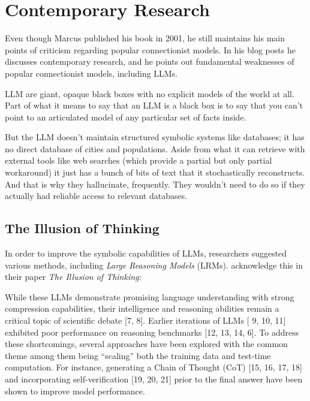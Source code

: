 \documentclass[../../main.tex]{subfiles}
\begin{document}
\chapter{Contemporary Research}
Even though Marcus published his book in 2001, he still maintains his main points of criticism regarding popular connectionist models. In his blog posts he discusses contemporary research, and he points out fundamental weaknesses of popular connectionist models, including LLMs.

\begin{citecallout}
    LLM are giant, opaque black boxes with no explicit models of the world at all. Part of what it means to say that an LLM is a black box is to say that you can’t point to an articulated model of any particular set of facts inside.
\end{citecallout}

\begin{citecallout}
    But the LLM doesn't maintain structured symbolic systems like databases; it has no direct database of cities and populations. Aside from what it can retrieve with external tools like web searches (which provide a partial but only partial workaround) it just has a bunch of bits of text that it stochastically reconstructs. And that is why they hallucinate, frequently. They wouldn't need to do so if they actually had reliable access to relevant databases.
\end{citecallout}

\section{The Illusion of Thinking}
In order to improve the symbolic capabilities of LLMs, researchers suggested various methods, including \emph{Large Reasoning Models} (LRMs). \textcite{illusion-of-thinking} acknowledge this in their paper \emph{The Illusion of Thinking}:

\begin{newcite}
    While these LLMs demonstrate promising
    language understanding with strong compression capabilities, their intelligence and reasoning abilities
    remain a critical topic of scientific debate [7, 8]. Earlier iterations of LLMs [ 9, 10, 11] exhibited
    poor performance on reasoning benchmarks [12, 13, 14, 6]. To address these shortcomings, several
    approaches have been explored with the common theme among them being “scaling” both the training
    data and test-time computation. For instance, generating a Chain of Thought (CoT) [15, 16, 17, 18]
    and incorporating self-verification [19, 20, 21] prior to the final answer have been shown to improve
    model performance.
\end{newcite}
\end{document}
